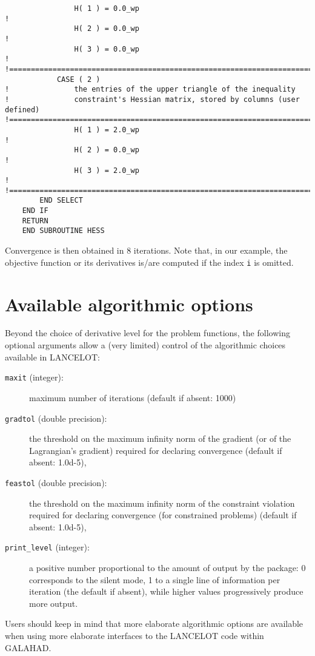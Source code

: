 \documentclass{article}
\begin{document}
\begin{lstlisting}
                H( 1 ) = 0.0_wp                                               !
                H( 2 ) = 0.0_wp                                               !
                H( 3 ) = 0.0_wp                                               !
!==============================================================================
            CASE ( 2 )
!               the entries of the upper triangle of the inequality
!               constraint's Hessian matrix, stored by columns (user defined)
!==============================================================================
                H( 1 ) = 2.0_wp                                               !
                H( 2 ) = 0.0_wp                                               !
                H( 3 ) = 2.0_wp                                               !
!==============================================================================
        END SELECT
    END IF
    RETURN
    END SUBROUTINE HESS
\end{lstlisting}
\noindent
Convergence is then obtained in 8 iterations.   Note that, in our
example, the objective function or its derivatives is/are computed if
the index {\tt i} is omitted.

\section{Available algorithmic options}

Beyond the choice of derivative level for the problem functions, the
following optional arguments allow a (very limited) control of the algorithmic
choices available in {\sf LANCELOT}:
\begin{description}
\item[{\tt maxit} (integer):] maximum number of iterations (default if 
absent: 1000)
\item[{\tt gradtol} (double precision):] the threshold on the maximum
infinity norm of the gradient (or of the Lagrangian's gradient) required
for declaring convergence (default if absent: 1.0d-5),
\item[{\tt feastol} (double precision):] the threshold on the maximum
infinity norm of the constraint violation required for declaring convergence
(for constrained problems) (default if absent: 1.0d-5),
\item[{\tt print\_level} (integer):] a positive number proportional to the
amount of output by the package: 0 corresponds to the silent mode, 1
to a single line of information per iteration (the default if absent), while
higher values progressively produce more output.
\end{description}
Users should keep in mind that more elaborate algorithmic options are
available
when using more elaborate interfaces to the {\sf LANCELOT} code within
{\sf GALAHAD}.
\end{document}
